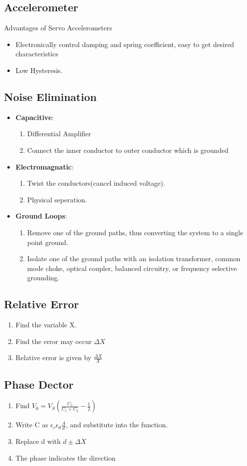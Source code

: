 \documentclass{article}
\begin{document}
	
	\subsection{Accelerometer}
	Advantages of Servo Accelerometers
	\begin{itemize}
		\item Electronically control damping and spring coefficient, easy to get desired characteristics
		\item Low Hysteresis.
	\end{itemize}
	
	\subsection{Noise Elimination}
	\begin{itemize}
		\item \textbf{Capacitive}: \begin{enumerate}
			\item Differential Amplifier
			\item Connect the inner conductor to outer conductor which is grounded
		\end{enumerate}
		
		\item \textbf{Electromagnatic}: \begin{enumerate}
			\item Twist the conductors(cancel induced voltage).
			\item Physical seperation.
		\end{enumerate}
		
		\item \textbf{Ground Loops}: \begin{enumerate}
			\item Remove one of the ground paths, thus converting the system to a single point ground.
			
			\item Isolate one of the ground paths with an isolation transformer, common mode choke, optical coupler, balanced circuitry, or frequency selective grounding.
		\end{enumerate}
	\end{itemize}
	\subsection{Relative Error}
	\begin{enumerate}
		\item Find the variable X.
		\item Find the error may occur $\Delta X$
		\item Relative error is given by $\frac{\Delta X}{X}$ 
	\end{enumerate}    
	
	\subsection{Phase Dector}
	\begin{enumerate}
		\item Find $V_0 = V_S(\frac{C_1}{C_1 + C_2} - \frac{1}{2})$
		\item Write C as $\epsilon_r\epsilon_0 \frac{A}{d}$, and substitute into the function.
		\item Replace d with $d \pm \Delta X$
		\item The phase indicates the direction
	\end{enumerate}
	
	
\end{document}
